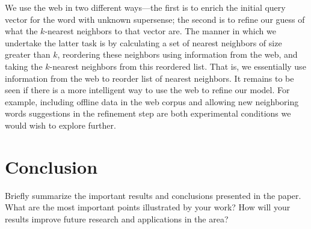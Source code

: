\documentclass{article}
\begin{document}
We use the web in two different ways---the first is to enrich the initial query vector for the word with unknown supersense; the second is to refine our guess of what the $k$-nearest neighbors to that vector are.
The manner in which we undertake the latter task is by calculating a set of nearest neighbors of size greater than $k$, reordering these neighbors using information from the web, and taking the $k$-nearest neighbors from this reordered list.
That is, we essentially use information from the web to reorder list of nearest neighbors.
It remains to be seen if there is a more intelligent way to use the web to  refine our model.
For example, including offline data in the web corpus and allowing new neighboring words suggestions in the refinement step are both experimental conditions we would wish to explore further.

\section{Conclusion}

Briefly summarize the important results and conclusions presented in the paper. What are the most important points illustrated by your work? How will your results improve future research and applications in the area? 




{}

\end{document}
